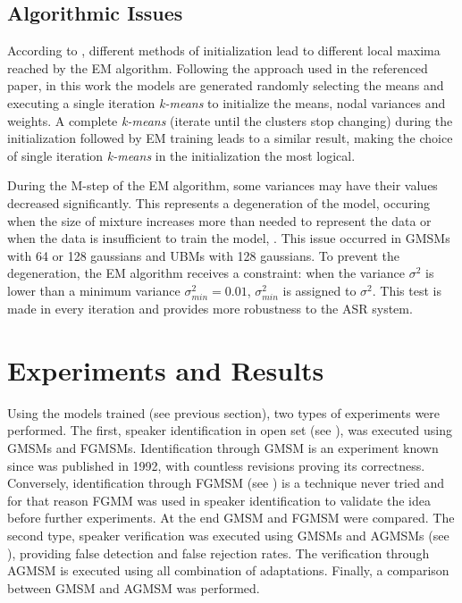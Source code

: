 \subsection{Algorithmic Issues}

According to , different methods of initialization lead to different local maxima reached by the EM algorithm. Following the approach used in the referenced paper, in this work the models are generated randomly selecting the means and executing a single iteration \emph{k-means} to initialize the means, nodal variances and weights. A complete \emph{k-means} (iterate until the clusters stop changing) during the initialization followed by EM training leads to a similar result, making the choice of single iteration \emph{k-means} in the initialization the most logical.

During the M-step of the EM algorithm, some variances may have their values decreased significantly. This represents a degeneration of the model, occuring when the size of mixture increases more than needed to represent the data or when the data is insufficient to train the model, . This issue occurred in GMSMs with 64 or 128 gaussians and UBMs with 128 gaussians. To prevent the degeneration, the EM algorithm receives a constraint: when the variance $\sigma^2$ is lower than a minimum variance $\sigma_{min}^2 = 0.01$, $\sigma_{min}^2$ is assigned to $\sigma^2$. This test is made in every iteration and provides more robustness to the ASR system.

\section{Experiments and Results}
\label{sec:experiments-and-results}

Using the models trained (see previous section), two types of experiments were performed. The first, speaker identification in open set (see ), was executed using GMSMs and FGMSMs. Identification through GMSM is an experiment known since  was published in 1992, with countless revisions proving its correctness. Conversely, identification through FGMSM (see ) is a technique never tried and for that reason FGMM was used in speaker identification to validate the idea before further experiments. At the end GMSM and FGMSM were compared. The second type, speaker verification was executed using GMSMs and AGMSMs (see ), providing false detection and false rejection rates. The verification through AGMSM is executed using all combination of adaptations. Finally, a comparison between GMSM and AGMSM was performed.

